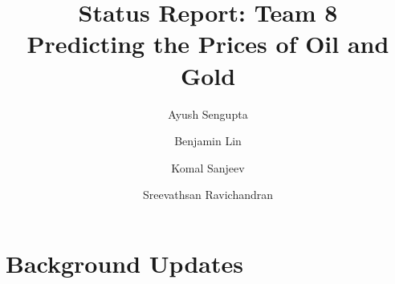 \documentclass[runningheads]{llncs}
\newcommand{\keywords}[1]{\par\addvspace\baselineskip
\noindent\keywordname\enspace\ignorespaces#1}
\newcommand{\swallow}[1]{ }
\begin{document}
\mainmatter  %

\title{Status Report: Team 8\\
Predicting the Prices of Oil and Gold}


%
%
\author{Ayush Sengupta \and Benjamin Lin \and Komal Sanjeev \and Sreevathsan Ravichandran}
%


%
%

\maketitle

\swallow{   %
\begin{abstract}
The abstract should summarize the contents of the paper and should
contain at least 70 and at most 150 words. It should be written using the
\emph{abstract} environment.
\keywords{We would like to encourage you to list your keywords within
the abstract section}
\end{abstract}
}


\section{Background Updates} 
\end{document}

